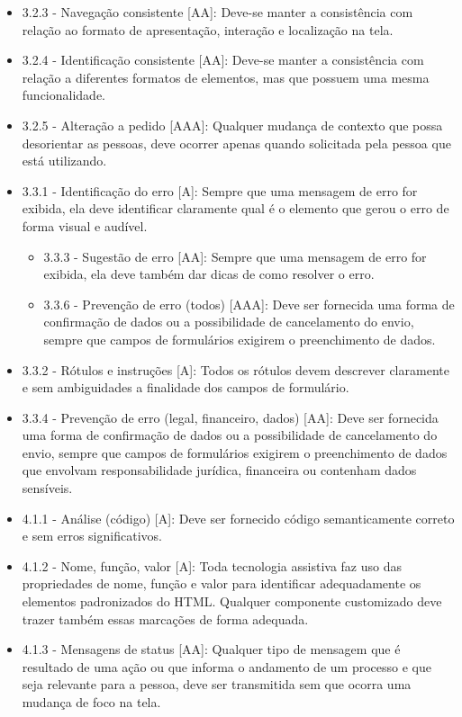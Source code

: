 {\begin{itemize}
\item 3.2.3 - Navegação consistente [AA]: Deve-se manter a consistência com relação ao formato de apresentação, interação e localização na tela.
\item 3.2.4 - Identificação consistente [AA]: Deve-se manter a consistência com relação a diferentes formatos de elementos, mas que possuem uma mesma funcionalidade.
\item 3.2.5 - Alteração a pedido [AAA]: Qualquer mudança de contexto que possa desorientar as pessoas, deve ocorrer apenas quando solicitada pela pessoa que está utilizando.
\item 3.3.1 - Identificação do erro [A]: Sempre que uma mensagem de erro for exibida, ela deve identificar claramente qual é o elemento que gerou o erro de forma visual e audível.
\begin{itemize}
\item  3.3.3 - Sugestão de erro [AA]: Sempre que uma mensagem de erro for exibida, ela deve também dar dicas de como resolver o erro.
\item 3.3.6 - Prevenção de erro (todos) [AAA]: Deve ser fornecida uma forma de confirmação de dados ou a possibilidade de cancelamento do envio, sempre que campos de formulários exigirem o preenchimento de dados.
\end{itemize}
\item 3.3.2 - Rótulos e instruções [A]: Todos os rótulos devem descrever claramente e sem ambiguidades a finalidade dos campos de formulário.
\item 3.3.4 - Prevenção de erro (legal, financeiro, dados) [AA]: Deve ser fornecida uma forma de confirmação de dados ou a possibilidade de cancelamento do envio, sempre que campos de formulários exigirem o preenchimento de dados que envolvam responsabilidade jurídica, financeira ou contenham dados sensíveis.
\item 4.1.1 - Análise (código) [A]: Deve ser fornecido código semanticamente correto e sem erros significativos.
\item 4.1.2 - Nome, função, valor [A]: Toda tecnologia assistiva faz uso das propriedades de nome, função e valor para identificar adequadamente os elementos padronizados do HTML. Qualquer componente customizado deve trazer também essas marcações de forma adequada.
\item 4.1.3 - Mensagens de status [AA]: Qualquer tipo de mensagem que é resultado de uma ação ou que informa o andamento de um processo e que seja relevante para a pessoa, deve ser transmitida sem que ocorra uma mudança de foco na tela.
\end{itemize}
}

